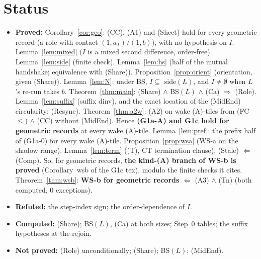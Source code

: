 \documentclass[11pt]{article}
\theoremstyle{definition}\newtheorem{definition}[theorem]{Definition}\newtheorem{remark}[theorem]{Remark}
\begin{document}
\section*{Status}
\begin{itemize}
\item \textbf{Proved:} Corollary~\ref{cor:geo}: (CC), (A1) and (Sheet) hold for every geometric record (a role with contact $(1,a_T)/(1,b)$), with no hypothesis on $I$. Lemma~\ref{lem:mixed} ($I$ is a mixed second difference, order-free). Lemma~\ref{lem:side} (finite check). Lemma~\ref{lem:hs} (half of the mutual handshake; equivalence with (Share)). Proposition~\ref{prop:orient} (orientation, given (Share)). Lemma~\ref{lem:N}: under BS, $I\subseteq$ side$(L)$, and $I\ne\emptyset$ when $L$'s re-run takes $b$. Theorem~\ref{thm:main}: (Share) $\wedge$ BS$(L)$ $\wedge$ (Ca) $\Rightarrow$ (Role). Lemma~\ref{lem:suffix} (suffix dinv), and the exact location of the (MidEnd) circularity: (Resync). Theorem~\ref{thm:a2w}: (A2) on wake (A)-tiles from (FC$\le$) $\wedge$ (CC) without (MidEnd). Hence \textbf{(G1a-A) and G1c hold for geometric records} at every wake (A)-tile. Lemma~\ref{lem:pref}: the prefix half of (G1a-0) for every wake (A)-tile. Proposition~\ref{prop:wsa} (WS-a on the shadow range). Lemma~\ref{lem:term} ((T), CT termination clause). (Stale) $\Leftarrow$ (Comp). So, for geometric records, \textbf{the kind-(A) branch of WS-b is proved} (Corollary~wsb of the G1c tex), modulo the finite checks it cites. Theorem~\ref{thm:wsb}: \textbf{WS-b for geometric records} $\Leftarrow$ (A3) $\wedge$ (Tn) (both computed, 0 exceptions).
\item \textbf{Refuted:} the step-index sign; the order-dependence of $I$.
\item \textbf{Computed:} (Share); BS$(L)$, (Ca) at both sizes; Step~0 tables; the suffix hypotheses at the rejoin.
\item \textbf{Not proved:} (Role) unconditionally; (Share); BS$(L)$; (MidEnd).
\end{itemize}
\end{document}

